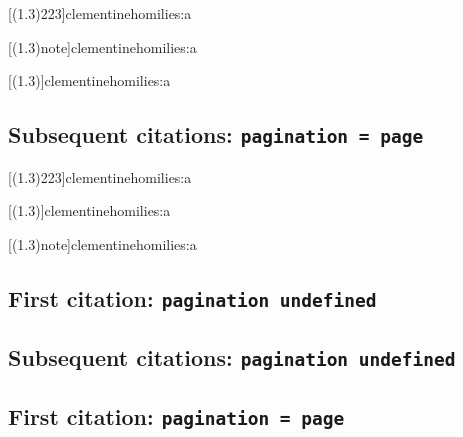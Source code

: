 \documentclass[a4paper]{article}
\begin{document}
\cite[(1.3)]{clementinehomilies:a}

\citereset
\cite[(1.3)8:223]{clementinehomilies:a}

\citereset
\cite[(1.3)223]{clementinehomilies:a}

\citereset
{}[(1.3)223]{clementinehomilies:a}

\citereset
{}[(1.3)note]{clementinehomilies:a}

\citereset
{}[(1.3)]{clementinehomilies:a}

\citereset
\cite[(1.3)note]{clementinehomilies:a}

\subsection{Subsequent citations: \texttt{pagination = page}}

\cite[(1.3)]{clementinehomilies:a}

\cite[(1.3)8:223]{clementinehomilies:a}

\cite[(1.3)223]{clementinehomilies:a}

[(1.3)223]{clementinehomilies:a}

[(1.3)]{clementinehomilies:a}

[(1.3)note]{clementinehomilies:a}

\cite[(1.3)note]{clementinehomilies:a}

\subsection{First citation: \texttt{pagination undefined}}

\cite{anderson:pepaideumenos}

\citereset
\cite[86]{anderson:pepaideumenos}

\citereset
\cite[note]{anderson:pepaideumenos}

\subsection{Subsequent citations: \texttt{pagination undefined}}

\cite{anderson:pepaideumenos}

\cite[86]{anderson:pepaideumenos}

\cite[note]{anderson:pepaideumenos}

\subsection{First citation: \texttt{pagination = page}}
\end{document}
